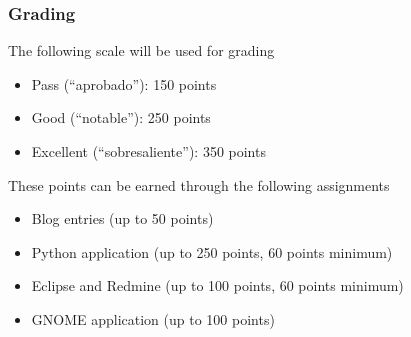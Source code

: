 \documentclass[11pt]{beamer}
\begin{document}
\begin{frame}[fragile]\frametitle{Grading}
\label{sec-1_4}

The following scale will be used for grading
\begin{itemize}
\item Pass (``aprobado''): 150 points
\item Good (``notable''): 250 points
\item Excellent (``sobresaliente''): 350 points
\end{itemize}

These points can be earned through the following assignments
\begin{itemize}
\item Blog entries (up to 50 points)
\item Python application (up to 250 points, 60 points minimum)
\item Eclipse and Redmine (up to 100 points, 60 points minimum)
\item GNOME application (up to 100 points)
\end{itemize}
\end{frame}
\end{document}
